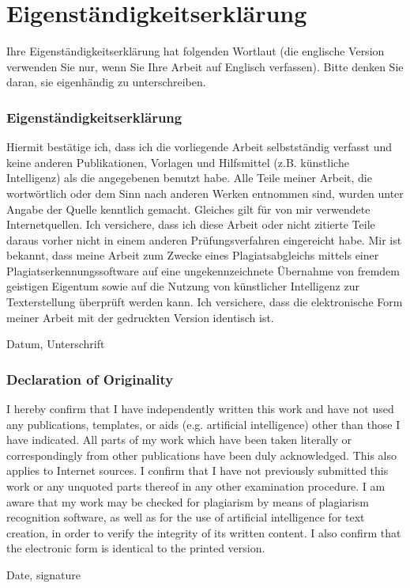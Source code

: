 \chapter{Eigenständigkeitserklärung}
\label{app:eigenstaendigkeitserklaerung}

Ihre Eigenständigkeitserklärung hat folgenden Wortlaut (die englische Version verwenden Sie nur, wenn Sie Ihre Arbeit auf Englisch verfassen). Bitte denken Sie daran, sie eigenhändig zu unterschreiben.

\subsection*{Eigenständigkeitserklärung}

Hiermit bestätige ich, dass ich die vorliegende Arbeit selbstständig verfasst und keine anderen Publikationen, Vorlagen und Hilfsmittel (z.B. künstliche Intelligenz) als die angegebenen benutzt habe. Alle Teile meiner Arbeit, die wortwörtlich oder dem Sinn nach anderen Werken entnommen sind, wurden unter Angabe der Quelle kenntlich gemacht. Gleiches gilt für von mir verwendete Internetquellen. Ich versichere, dass ich diese Arbeit oder nicht zitierte Teile daraus vorher nicht in einem anderen Prüfungsverfahren eingereicht habe. Mir ist bekannt, dass meine Arbeit zum Zwecke eines Plagiatsabgleichs mittels einer Plagiatserkennungssoftware auf eine ungekennzeichnete Übernahme von fremdem geistigen Eigentum sowie auf die Nutzung von künstlicher Intelligenz zur Texterstellung überprüft werden kann. Ich versichere, dass die elektronische Form meiner Arbeit mit der gedruckten Version identisch ist.

Datum, Unterschrift

\subsection*{Declaration of Originality}

I hereby confirm that I have independently written this work and have not used any publications, templates, or aids (e.g. artificial intelligence) other than those I have indicated. All parts of my work which have been taken literally or correspondingly from other publications have been duly acknowledged. This also applies to Internet sources. I confirm that I have not previously submitted this work or any unquoted parts thereof in any other examination procedure. I am aware that my work may be checked for plagiarism by means of plagiarism recognition software, as well as for the use of artificial intelligence for text creation, in order to verify the integrity of its written content. I also confirm that the electronic form is identical to the printed version.

Date, signature